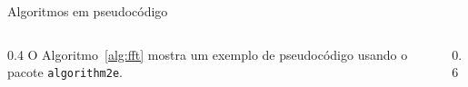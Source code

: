 \documentclass{beamer}
\begin{document}
\begin{frame}{Algoritmos em pseudocódigo}
    \begin{columns}
        \begin{column}{0.4\textwidth}
            O Algoritmo~\ref{alg:fft} mostra um exemplo de pseudocódigo usando o pacote \texttt{algorithm2e}.
        \end{column}
        \begin{column}{0.6\textwidth}
            \begin{algorithm}[H]
                \caption{FFT de Cooley-Tukey}
                \label{alg:fft}
                \DontPrintSemicolon
            \end{algorithm}
        \end{column}
    \end{columns}
\end{frame}
\end{document}
